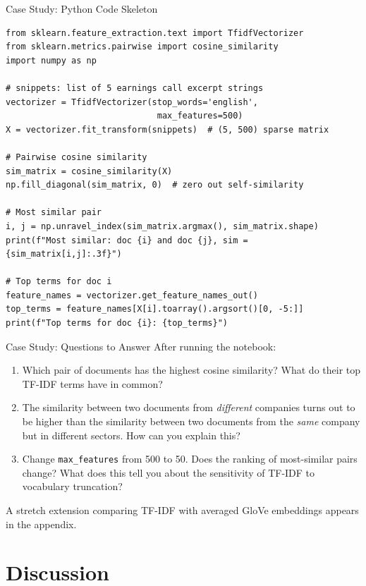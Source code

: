 \documentclass[9pt,t]{beamer}
\begin{document}
\begin{frame}[fragile]{Case Study: Python Code Skeleton}
\begin{lstlisting}[basicstyle=\ttfamily\scriptsize]
from sklearn.feature_extraction.text import TfidfVectorizer
from sklearn.metrics.pairwise import cosine_similarity
import numpy as np

# snippets: list of 5 earnings call excerpt strings
vectorizer = TfidfVectorizer(stop_words='english',
                              max_features=500)
X = vectorizer.fit_transform(snippets)  # (5, 500) sparse matrix

# Pairwise cosine similarity
sim_matrix = cosine_similarity(X)
np.fill_diagonal(sim_matrix, 0)  # zero out self-similarity

# Most similar pair
i, j = np.unravel_index(sim_matrix.argmax(), sim_matrix.shape)
print(f"Most similar: doc {i} and doc {j}, sim = {sim_matrix[i,j]:.3f}")

# Top terms for doc i
feature_names = vectorizer.get_feature_names_out()
top_terms = feature_names[X[i].toarray().argsort()[0, -5:]]
print(f"Top terms for doc {i}: {top_terms}")
\end{lstlisting}
\end{frame}

\begin{frame}{Case Study: Questions to Answer}
  After running the notebook:
  \medskip
  \begin{enumerate}
    \item Which pair of documents has the highest cosine similarity?
          What do their top TF-IDF terms have in common?
    \medskip
    \item The similarity between two documents from \emph{different} companies
          turns out to be higher than the similarity between two documents from the
          \emph{same} company but in different sectors. How can you explain this?
    \medskip
    \item Change \texttt{max\_features} from 500 to 50. Does the ranking of most-similar
          pairs change? What does this tell you about the sensitivity of TF-IDF to vocabulary truncation?
  \end{enumerate}
  \medskip
  \small A stretch extension comparing TF-IDF with averaged GloVe embeddings appears in the appendix.
\end{frame}

\section{Discussion}
\end{document}
